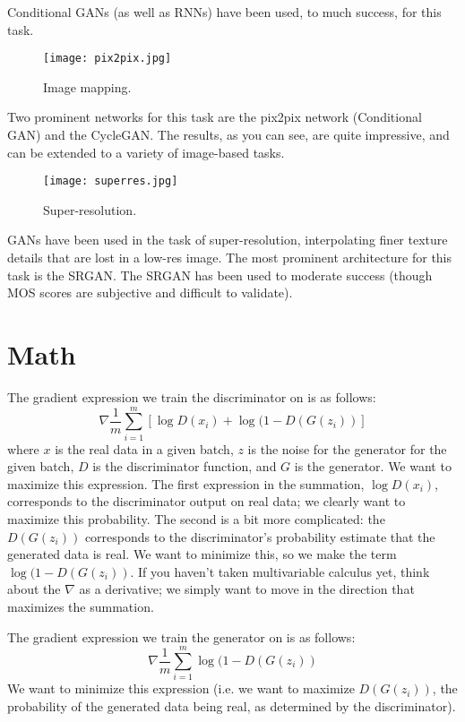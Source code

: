 \documentclass{article}
\begin{document}
    Conditional GANs (as well as RNNs) have been used, to much success, for this task.
    
    
    
    \begin{figure}[H]
        \centerline{\texttt{[image: pix2pix.jpg]}}
        \caption{Image mapping.}
        \label{fig:mapping}
    \end{figure}
    
    Two prominent networks for this task are the pix2pix network (Conditional GAN) and the CycleGAN. The results, as you can see, are quite impressive, and can be extended to a variety of image-based tasks.
    
    \begin{figure}[H]
        \centerline{\texttt{[image: superres.jpg]}}
        \caption{Super-resolution.}
        \label{fig:super-resolution}
    \end{figure}
    
    GANs have been used in the task of super-resolution, interpolating finer texture details that are lost in a low-res image. The most prominent architecture for this task is the SRGAN. The SRGAN has been used to moderate success (though MOS scores are subjective and difficult to validate). 
    
    
\section{Math}
    The gradient expression we train the discriminator on is as follows:
    $$\nabla \frac{1}{m} \sum_{i=1}^m [\log D(x_i) + \log(1-D(G(z_i))]$$
    where $x$ is the real data in a given batch, $z$ is the noise for the generator for the given batch, $D$ is the discriminator function, and $G$ is the generator. We want to maximize this expression. The first expression in the summation, $\log D(x_i)$, corresponds to the discriminator output on real data; we clearly want to maximize this probability. The second is a bit more complicated: the $D(G(z_i))$ corresponds to the discriminator's probability estimate that the generated data is real. We want to minimize this, so we make the term $\log (1-D(G(z_i))$. If you haven't taken multivariable calculus yet, think about the $\nabla$ as a derivative; we simply want to move in the direction that maximizes the summation.
    
    The gradient expression we train the generator on is as follows:
    $$\nabla \frac{1}{m} \sum_{i=1}^m \log(1-D(G(z_i))$$
    We want to minimize this expression (i.e. we want to maximize $D(G(z_i))$, the probability of the generated data being real, as determined by the discriminator).
    
\end{document}
